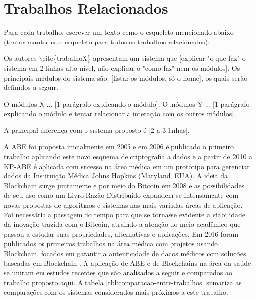 \documentclass[a4paper,11pt]{article}
\begin{document}
\newpage
\section{Trabalhos Relacionados}

{\color{ForestGreen} Para cada trabalho, escrever um texto como o esqueleto mencionado abaixo (tentar manter esse esqueleto para todos os trabalhos relacionados):

Os autores  $\backslash$cite\{trabalhoX\} apresentam um sistema que [explicar "o que faz" o sistema em 2 linhas alto nível, não explicar o "como faz" nem os módulos]. Os principais módulos do sistema são: [listar os módulos, só o nome], os quais serão definidos a seguir.

O módulos X ... [1 parágrafo explicando o módulo].
O módulos Y ... [1  parágrafo explicando o módulo e tentar relacionar a interação com os outros módulos].

A principal diferença com o sistema proposto é [2 a 3 linhas].}

A ABE foi proposta inicialmente em 2005 \cite{Sahai2005} e em 2006 \cite{Goyal2006} é publicado o primeiro trabalho aplicando este novo esquema de criptografia a dados e a partir de 2010 \cite{Akinyele2010} a KP-ABE é aplicada com sucesso na área médica em um protótipo para gerenciar dados da Instituição Médica Johns Hopkins (Maryland, EUA).
A ideia da Blockchain surge juntamente e por meio do Bitcoin em 2008 \cite{nakamoto2008bitcoin} e as possibilidades de seu uso como um Livro-Razão Distribuído expandem-se intensamente com novas propostas de algoritmos e sistemas nas mais variadas áreas de aplicação.
Foi necessário a passagem do tempo para que se tornasse evidente a viabilidade da inovação trazida com o Bitcoin, atraindo a atenção do meio acadêmico que passou a estudar suas propriedades, alternativas e aplicações.
Em 2016 foram publicados os primeiros trabalhos na área médica com projetos usando Blockchain, focados em garantir a autenticidade de dados médicos com soluções baseadas em Blockchain \cite{Zhang2016,Azaria2016,Ekblaw2016}.
A aplicação de ABE e de Blockchains na área da saúde se uniram em estudos recentes que são analisados a seguir e comparados ao trabalho proposto aqui.
A tabela \ref{tbl:comparacao-entre-trabalhos} sumariza as comparações com os sistemas considerados mais próximos a este trabalho.
\end{document}
